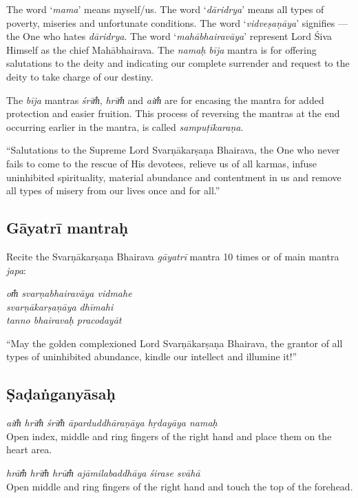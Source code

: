 \documentclass[12pt,oneside,a4paper]{article}
\newenvironment{shloka}[1]
  {\bigskip\center#1\varwidth{\linewidth}}
  {\endvarwidth\endcenter\bigskip}
\newcommand{\tl}[1]{\emph{#1}}
\begin{document}
The word ‘\tl{mama}’ means myself/us. The word ‘\tl{dāridrya}’ means all types
of poverty, miseries and unfortunate conditions. The word ‘\tl{vidveṣaṇāya}’
signifies — the One who hates \tl{dāridrya}. The word ‘\tl{mahābhairavāya}’
represent Lord Śiva Himself as the chief Mahābhairava. The \tl{namaḥ} \tl{bīja}
mantra is for offering salutations to the deity and indicating our complete
surrender and request to the deity to take charge of our destiny.

The \tl{bīja} mantras \tl{śrīm̐}, \tl{hrīm̐} and \tl{aim̐} are for encasing
the mantra for added protection and easier fruition. This process of reversing
the mantras at the end occurring earlier in the mantra, is called
\tl{sampuṭīkaraṇa}.

``Salutations to the Supreme Lord Svarṇākarṣaṇa Bhairava, the One who never fails
to come to the rescue of His devotees, relieve us of all karmas, infuse
uninhibited spirituality, material abundance and contentment in us and remove
all types of misery from our lives once and for all.''

\subsection{Gāyatrī mantraḥ}

Recite the Svarṇākarṣaṇa Bhairava \tl{gāyatrī} mantra 10 times or 
of main mantra \tl{japa}:

\begin{shloka}\itshape
  om̐ svarṇabhairavāya vidmahe\\
  svarṇākarṣaṇāya dhīmahi\\
  tanno bhairavaḥ pracodayāt
\end{shloka}

``May the golden complexioned Lord Svarṇākarṣaṇa Bhairava, the grantor of all
types of uninhibited abundance, kindle our intellect and illumine it!''

\subsection{Ṣaḍaṅganyāsaḥ}

\tl{aim̐ hrīm̐ śrīm̐ āparduddhāraṇāya hṛdayāya namaḥ}\\
Open index, middle and ring fingers of the right hand and place them on
the heart area.

\tl{hrām̐ hrīm̐ hrūm̐ ajāmilabaddhāya śirase svāhā}\\
Open middle and ring fingers of the right hand and touch the top of
the forehead.
\end{document}
